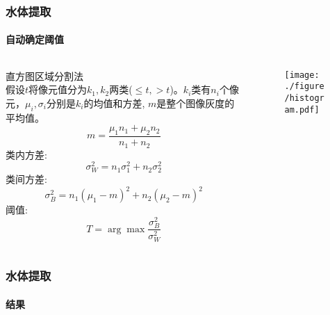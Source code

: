 \documentclass[10pt]{beamer}
\begin{document}
\begin{frame}
 \frametitle{水体提取}
 \framesubtitle{自动确定阈值}
\begin{columns}
	\begin{column}{0.4\textwidth}
	\footnotesize
	\alert{直方图区域分割法}\\
	假设$t$将像元值分为$k_1,k_2$两类($\leq t,>t$)。$k_i$类有$n_i$个像元，$\mu_i,\sigma_i$分别是$k_i$的均值和方差, $m$是整个图像灰度的平均值。
	\[m=\frac{\mu_1n_1+\mu_2n_2}{n_1+n_2}\]
	类内方差:
	\[\sigma_W^2=n_1\sigma_1^2+n_2\sigma_2^2\]
	类间方差:
	\[\sigma_B^2=n_1(\mu_1-m)^2+n_2(\mu_2-m)^2\]
	阈值:
	\[T=\arg \max\frac{\sigma_B^2}{\sigma_W^2}\]
	\end{column}
	\begin{column}{0.6\textwidth}
	\begin{figure}
	\flushleft
	\texttt{[image: ./figure/histogram.pdf]}
	\end{figure}
	\end{column}
\end{columns}
\end{frame}

\begin{frame}
	 \frametitle{水体提取}
 \framesubtitle{结果}
 \begin{figure}
 	\centering
 \end{figure}
\end{frame}
\end{document}
